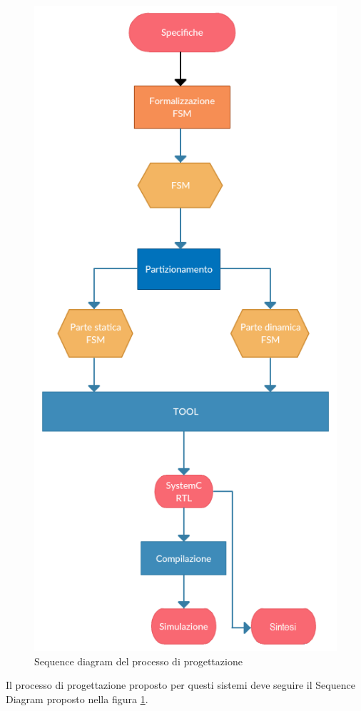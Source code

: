 \documentclass[a4paper,titlepage]{book}
\begin{document}
\begin{figure}[!hb]
\centering
\includegraphics[scale=0.75]{processo.png}
\caption{Sequence diagram del processo di progettazione}\label{fig:b}
\end{figure}

Il processo di progettazione proposto per questi sistemi deve seguire il Sequence Diagram proposto nella figura \ref{fig:b}.
\end{document}
